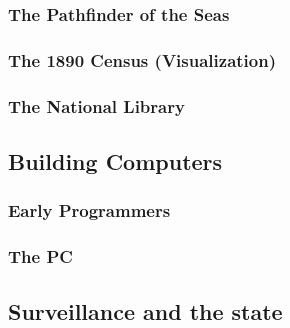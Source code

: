 \subsubsection{The Pathfinder of the Seas}

\subsubsection{The 1890 Census (Visualization)}

\cite{kinnahan_charting_2008} \cite{hannah_governnmentality_2000}

\subsubsection{The National Library}

\subsection{Building Computers}

\subsubsection{Early Programmers}

\subsubsection{The PC}

\cite{whole_earth_catalog}

\subsection{Surveillance and the state}
